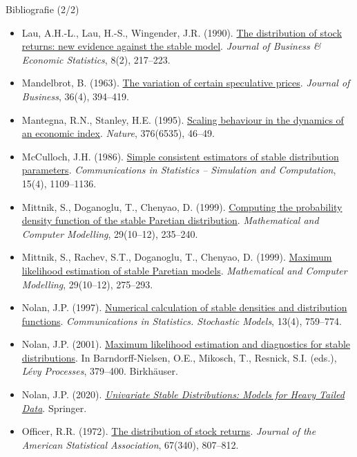 \begin{frame}{Bibliografie (2/2)}
\itemsize{\tiny}
\begin{itemize}
    \item Lau, A.H.-L., Lau, H.-S., Wingender, J.R. (1990). \href{https://doi.org/10.1080/07350015.1990.10509793}{The distribution of stock returns: new evidence against the stable model}. \textit{Journal of Business \& Economic Statistics}, 8(2), 217--223.
    \item Mandelbrot, B. (1963). \href{https://doi.org/10.1086/294632}{The variation of certain speculative prices}. \textit{Journal of Business}, 36(4), 394--419.
    \item Mantegna, R.N., Stanley, H.E. (1995). \href{https://doi.org/10.1038/376046a0}{Scaling behaviour in the dynamics of an economic index}. \textit{Nature}, 376(6535), 46--49.
    \item McCulloch, J.H. (1986). \href{https://doi.org/10.1080/03610918608812563}{Simple consistent estimators of stable distribution parameters}. \textit{Communications in Statistics -- Simulation and Computation}, 15(4), 1109--1136.
    \item Mittnik, S., Doganoglu, T., Chenyao, D. (1999). \href{https://doi.org/10.1016/S0895-7177(99)00106-5}{Computing the probability density function of the stable Paretian distribution}. \textit{Mathematical and Computer Modelling}, 29(10--12), 235--240.
    \item Mittnik, S., Rachev, S.T., Doganoglu, T., Chenyao, D. (1999). \href{https://doi.org/10.1016/S0895-7177(99)00110-7}{Maximum likelihood estimation of stable Paretian models}. \textit{Mathematical and Computer Modelling}, 29(10--12), 275--293.
    \item Nolan, J.P. (1997). \href{https://doi.org/10.1080/15326349708807450}{Numerical calculation of stable densities and distribution functions}. \textit{Communications in Statistics. Stochastic Models}, 13(4), 759--774.
    \item Nolan, J.P. (2001). \href{https://doi.org/10.1007/978-1-4612-0197-7_17}{Maximum likelihood estimation and diagnostics for stable distributions}. In Barndorff-Nielsen, O.E., Mikosch, T., Resnick, S.I. (eds.), \textit{Lévy Processes}, 379--400. Birkhäuser.
    \item Nolan, J.P. (2020). \href{https://doi.org/10.1007/978-3-030-52915-4}{\textit{Univariate Stable Distributions: Models for Heavy Tailed Data}}. Springer.
    \item Officer, R.R. (1972). \href{https://doi.org/10.1080/01621459.1972.10481297}{The distribution of stock returns}. \textit{Journal of the American Statistical Association}, 67(340), 807--812.

\end{itemize}
\end{frame}
